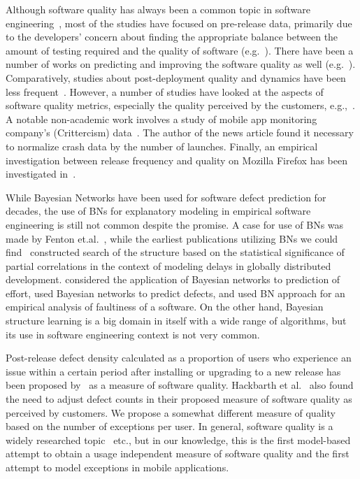 \documentclass[smallcondensed]{svjour3}     %
\begin{document}
Although software quality has always been a common
topic in software engineering~\cite{boehm1976quantitative,kitchenham1996software}, most of
the studies have focused on pre-release data, primarily due to the
developers' concern about finding the appropriate balance between
the amount of testing required and the quality of software
(e.g.~\cite{rubin2016challenges,dalal1988should}). There have been a
number of works on predicting and improving the software quality as
well (e.g.~\cite{MHP13,zhang2015towards,KSAHMSU13,MW00}). Comparatively,
studies about post-deployment quality and dynamics have been less
frequent~\cite{li2011characterizing,kenny1993estimating}. However, a
number of studies have looked at the aspects of software quality
metrics, especially the quality perceived by the customers,
e.g.,~\cite{mockus2005predictors,IQ08,hmps15,rotella2011implementing,M14}. A notable
non-academic work involves a study of mobile app monitoring
company's (Crittercism) data~\cite{crittercism12}. The author of the
news article found it necessary to normalize crash data by the
number of launches. Finally, an empirical investigation between
release frequency and quality on Mozilla Firefox has been
investigated in~\cite{khomh2012faster}. 

While Bayesian Networks have been used for software defect prediction 
for decades, the use of BNs for explanatory modeling in
empirical software engineering is still not common despite the
promise. A case for use of BNs was made
by Fenton et.al.~\cite{fenton1999critique,fenton2002software}, while the earliest publications
utilizing BNs we could find~\cite{HM03a} constructed search of the
structure based on the statistical significance of partial
correlations in the context of modeling delays in globally
distributed development. \cite{stamelos2003use,pendharkar2005probabilistic} considered
the application of Bayesian networks to prediction of effort, 
\cite{fenton2007predicting,neil1996predicting,okutan2014software} 
used Bayesian networks to predict defects, and \cite{pai2007empirical} 
used BN approach for an empirical analysis of faultiness of a software. 
On the other hand, Bayesian structure learning is a big domain in itself 
with a wide range of algorithms, but its use in software engineering context 
is not very common.

Post-release defect density calculated as a proportion of users who experience an issue within a certain period after installing or upgrading to a new release has been proposed by~\cite{mockus2008interval,mockus2005predictors} as a measure of software quality.  Hackbarth et al.~\cite{hackbarth2016improving} also found the need to adjust defect counts in their proposed measure of software quality as perceived by customers. We propose a somewhat different measure of quality based on the number of exceptions per user. In general, software quality is a widely researched topic~\cite{kan2002metrics,kitchenham1996software,schulmeyer1992handbook} etc., but in our knowledge, this is the first model-based attempt to obtain a usage independent measure of software quality and the first attempt to model exceptions in mobile applications.
\end{document}
